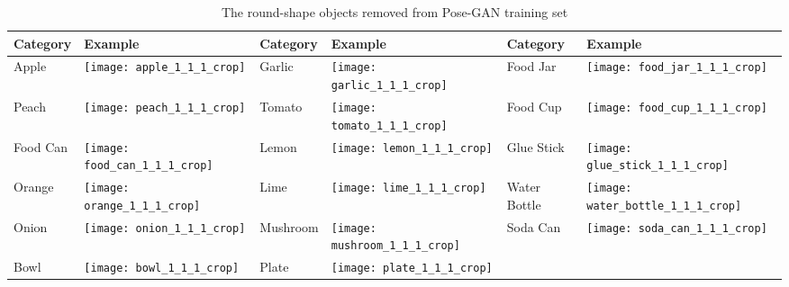 \begin{table}[h!]
	\centering
	\caption{The round-shape objects removed from Pose-GAN training set}
	\label{tab:removed_objects}
	\begin{tabular}{@{}llllll@{}}
		\toprule
		\textbf{Category}              & \textbf{Example}      & \textbf{Category}
		& \textbf{Example}      & \textbf{Category}             & \textbf{Example}      \\
		\midrule \multicolumn{1}{|l|}{Apple}    &
		\multicolumn{1}{l|}{\texttt{[image: apple\_1\_1\_1\_crop]}} &
		\multicolumn{1}{l|}{Garlic}       &
		\multicolumn{1}{l|}{\texttt{[image: garlic\_1\_1\_1\_crop]}} &
		\multicolumn{1}{|l|}{Food Jar} &
		\multicolumn{1}{l|}{\texttt{[image: food\_jar\_1\_1\_1\_crop]}}
		\\
		\midrule 
		\multicolumn{1}{|l|}{Peach}    &
		\multicolumn{1}{l|}{\texttt{[image: peach\_1\_1\_1\_crop]}} &
		\multicolumn{1}{|l|}{Tomato}   &
		\multicolumn{1}{l|}{\texttt{[image: tomato\_1\_1\_1\_crop]}} &
		\multicolumn{1}{|l|}{Food Cup} &
		\multicolumn{1}{l|}{\texttt{[image: food\_cup\_1\_1\_1\_crop]}}
		\\
		\midrule 
		\multicolumn{1}{|l|}{Food Can} &
		\multicolumn{1}{l|}{\texttt{[image: food\_can\_1\_1\_1\_crop]}} & 
		\multicolumn{1}{l|}{Lemon}        &
		\multicolumn{1}{l|}{\texttt{[image: lemon\_1\_1\_1\_crop]}} &
		\multicolumn{1}{l|}{Glue Stick}   &
		\multicolumn{1}{l|}{\texttt{[image: glue\_stick\_1\_1\_1\_crop]}}
		\\
		\midrule 
		\multicolumn{1}{|l|}{Orange}   &
		\multicolumn{1}{l|}{\texttt{[image: orange\_1\_1\_1\_crop]}} &
		\multicolumn{1}{l|}{Lime}         &
		\multicolumn{1}{l|}{\texttt{[image: lime\_1\_1\_1\_crop]}} &
		\multicolumn{1}{l|}{Water Bottle} &
		\multicolumn{1}{l|}{\texttt{[image: water\_bottle\_1\_1\_1\_crop]}}
		\\
		\midrule 
		\multicolumn{1}{|l|}{Onion}    &
		\multicolumn{1}{l|}{\texttt{[image: onion\_1\_1\_1\_crop]}} &
		\multicolumn{1}{l|}{Mushroom}     &
		\multicolumn{1}{l|}{\texttt{[image: mushroom\_1\_1\_1\_crop]}} &
		\multicolumn{1}{l|}{Soda Can} &
		\multicolumn{1}{l|}{\texttt{[image: soda\_can\_1\_1\_1\_crop]}} \\
		\midrule 
		\multicolumn{1}{|l|}{Bowl}     &
		\multicolumn{1}{l|}{\texttt{[image: bowl\_1\_1\_1\_crop]}} &
		\multicolumn{1}{l|}{Plate}    &
		\multicolumn{1}{l|}{\texttt{[image: plate\_1\_1\_1\_crop]}} &

		&                       \\ \cmidrule(r){1-4}
	\end{tabular}
\end{table}

